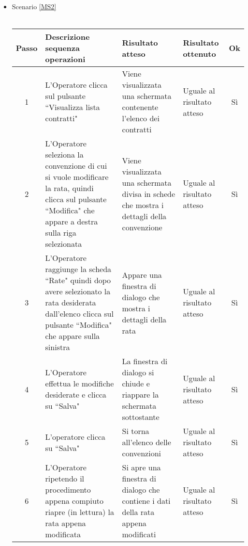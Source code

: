 \begin{itemize}
 \item Scenario \ref{MS2}\\\\
 {
 \footnotesize
  \begin{longtable}{|c|p{3cm}|p{3cm}|p{3cm}|c|}
    \hline
    Passo & Descrizione sequenza operazioni & Risultato atteso & Risultato ottenuto & Ok\\
    \hline
    1 & L'Operatore clicca sul pulsante ``Visualizza lista contratti" & Viene visualizzata una schermata contenente l'elenco dei contratti & Uguale 
      al risultato atteso& Sì\\
    \hline
    2 & L'Operatore seleziona la convenzione di cui si vuole modificare la rata, quindi clicca sul pulsante ``Modifica" che appare a destra sulla riga selezionata& Viene visualizzata una schermata divisa in schede che mostra i dettagli
    della convenzione& Uguale al risultato atteso & Sì\\
    \hline
    3 & L'Operatore raggiunge la scheda ``Rate" quindi dopo avere selezionato la rata desiderata dall'elenco clicca sul pulsante ``Modifica" che appare sulla sinistra& Appare una finestra di dialogo che mostra i dettagli della rata & Uguale al risultato atteso & Sì\\
    \hline
    4 & L'Operatore effettua le modifiche desiderate e clicca su ``Salva" & La finestra di dialogo si chiude e riappare la schermata sottostante & Uguale al risultato atteso& Sì\\
    \hline
    5 & L'operatore clicca su ``Salva"& Si torna all'elenco delle convenzioni & Uguale al risultato atteso & Sì\\
    \hline
    6  & L'Operatore ripetendo il procedimento appena compiuto riapre (in lettura) la rata appena modificata & Si apre una finestra di dialogo che contiene i dati della rata appena modificati & Uguale al risultato atteso & Sì\\
    \hline
\end{longtable}
}



\end{itemize}
